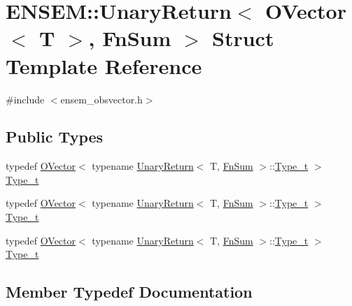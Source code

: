 \hypertarget{structENSEM_1_1UnaryReturn_3_01OVector_3_01T_01_4_00_01FnSum_01_4}{}\section{E\+N\+S\+EM\+:\+:Unary\+Return$<$ O\+Vector$<$ T $>$, Fn\+Sum $>$ Struct Template Reference}
\label{structENSEM_1_1UnaryReturn_3_01OVector_3_01T_01_4_00_01FnSum_01_4}


{\ttfamily \#include $<$ensem\+\_\+obsvector.\+h$>$}

\subsection*{Public Types}
\begin{DoxyCompactItemize}
\item 
typedef \mbox{\hyperlink{classENSEM_1_1OVector}{O\+Vector}}$<$ typename \mbox{\hyperlink{structENSEM_1_1UnaryReturn}{Unary\+Return}}$<$ T, \mbox{\hyperlink{structENSEM_1_1FnSum}{Fn\+Sum}} $>$\+::\mbox{\hyperlink{structENSEM_1_1UnaryReturn_3_01OVector_3_01T_01_4_00_01FnSum_01_4_aeade0fc333784b1705f2ab3348b5fed1}{Type\+\_\+t}} $>$ \mbox{\hyperlink{structENSEM_1_1UnaryReturn_3_01OVector_3_01T_01_4_00_01FnSum_01_4_aeade0fc333784b1705f2ab3348b5fed1}{Type\+\_\+t}}
\item 
typedef \mbox{\hyperlink{classENSEM_1_1OVector}{O\+Vector}}$<$ typename \mbox{\hyperlink{structENSEM_1_1UnaryReturn}{Unary\+Return}}$<$ T, \mbox{\hyperlink{structENSEM_1_1FnSum}{Fn\+Sum}} $>$\+::\mbox{\hyperlink{structENSEM_1_1UnaryReturn_3_01OVector_3_01T_01_4_00_01FnSum_01_4_aeade0fc333784b1705f2ab3348b5fed1}{Type\+\_\+t}} $>$ \mbox{\hyperlink{structENSEM_1_1UnaryReturn_3_01OVector_3_01T_01_4_00_01FnSum_01_4_aeade0fc333784b1705f2ab3348b5fed1}{Type\+\_\+t}}
\item 
typedef \mbox{\hyperlink{classENSEM_1_1OVector}{O\+Vector}}$<$ typename \mbox{\hyperlink{structENSEM_1_1UnaryReturn}{Unary\+Return}}$<$ T, \mbox{\hyperlink{structENSEM_1_1FnSum}{Fn\+Sum}} $>$\+::\mbox{\hyperlink{structENSEM_1_1UnaryReturn_3_01OVector_3_01T_01_4_00_01FnSum_01_4_aeade0fc333784b1705f2ab3348b5fed1}{Type\+\_\+t}} $>$ \mbox{\hyperlink{structENSEM_1_1UnaryReturn_3_01OVector_3_01T_01_4_00_01FnSum_01_4_aeade0fc333784b1705f2ab3348b5fed1}{Type\+\_\+t}}
\end{DoxyCompactItemize}


\subsection{Member Typedef Documentation}
\mbox{\label{structENSEM_1_1UnaryReturn_3_01OVector_3_01T_01_4_00_01FnSum_01_4_aeade0fc333784b1705f2ab3348b5fed1}} 
